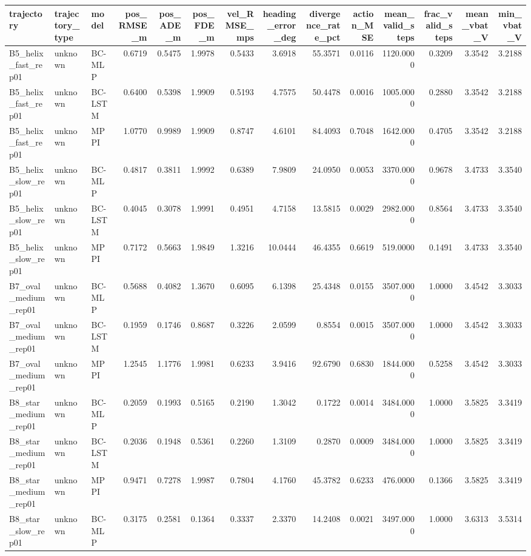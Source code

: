 \begin{tabular}{lllrrrrrrrrrrr}
\toprule
trajectory & trajectory_type & model & pos_RMSE_m & pos_ADE_m & pos_FDE_m & vel_RMSE_mps & heading_error_deg & divergence_rate_pct & action_MSE & mean_valid_steps & frac_valid_steps & mean_vbat_V & min_vbat_V \\
\midrule
B5_helix_fast_rep01 & unknown & BC-MLP & 0.6719 & 0.5475 & 1.9978 & 0.5433 & 3.6918 & 55.3571 & 0.0116 & 1120.0000 & 0.3209 & 3.3542 & 3.2188 \\
B5_helix_fast_rep01 & unknown & BC-LSTM & 0.6400 & 0.5398 & 1.9909 & 0.5193 & 4.7575 & 50.4478 & 0.0016 & 1005.0000 & 0.2880 & 3.3542 & 3.2188 \\
B5_helix_fast_rep01 & unknown & MPPI & 1.0770 & 0.9989 & 1.9909 & 0.8747 & 4.6101 & 84.4093 & 0.7048 & 1642.0000 & 0.4705 & 3.3542 & 3.2188 \\
B5_helix_slow_rep01 & unknown & BC-MLP & 0.4817 & 0.3811 & 1.9992 & 0.6389 & 7.9809 & 24.0950 & 0.0053 & 3370.0000 & 0.9678 & 3.4733 & 3.3540 \\
B5_helix_slow_rep01 & unknown & BC-LSTM & 0.4045 & 0.3078 & 1.9991 & 0.4951 & 4.7158 & 13.5815 & 0.0029 & 2982.0000 & 0.8564 & 3.4733 & 3.3540 \\
B5_helix_slow_rep01 & unknown & MPPI & 0.7172 & 0.5663 & 1.9849 & 1.3216 & 10.0444 & 46.4355 & 0.6619 & 519.0000 & 0.1491 & 3.4733 & 3.3540 \\
B7_oval_medium_rep01 & unknown & BC-MLP & 0.5688 & 0.4082 & 1.3670 & 0.6095 & 6.1398 & 25.4348 & 0.0155 & 3507.0000 & 1.0000 & 3.4542 & 3.3033 \\
B7_oval_medium_rep01 & unknown & BC-LSTM & 0.1959 & 0.1746 & 0.8687 & 0.3226 & 2.0599 & 0.8554 & 0.0015 & 3507.0000 & 1.0000 & 3.4542 & 3.3033 \\
B7_oval_medium_rep01 & unknown & MPPI & 1.2545 & 1.1776 & 1.9981 & 0.6233 & 3.9416 & 92.6790 & 0.6830 & 1844.0000 & 0.5258 & 3.4542 & 3.3033 \\
B8_star_medium_rep01 & unknown & BC-MLP & 0.2059 & 0.1993 & 0.5165 & 0.2190 & 1.3042 & 0.1722 & 0.0014 & 3484.0000 & 1.0000 & 3.5825 & 3.3419 \\
B8_star_medium_rep01 & unknown & BC-LSTM & 0.2036 & 0.1948 & 0.5361 & 0.2260 & 1.3109 & 0.2870 & 0.0009 & 3484.0000 & 1.0000 & 3.5825 & 3.3419 \\
B8_star_medium_rep01 & unknown & MPPI & 0.9471 & 0.7278 & 1.9987 & 0.7804 & 4.1760 & 45.3782 & 0.6233 & 476.0000 & 0.1366 & 3.5825 & 3.3419 \\
B8_star_slow_rep01 & unknown & BC-MLP & 0.3175 & 0.2581 & 0.1364 & 0.3337 & 2.3370 & 14.2408 & 0.0021 & 3497.0000 & 1.0000 & 3.6313 & 3.5314 \\

\end{tabular}

